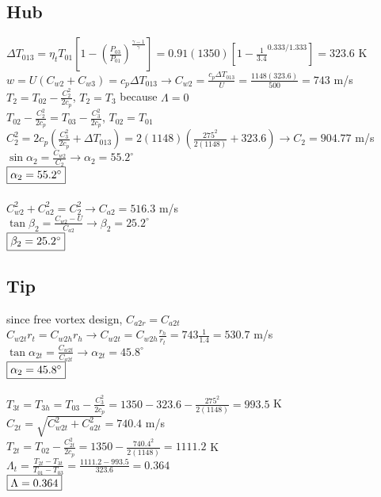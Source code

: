 \documentclass{article}
\begin{document}
\subsection*{Hub}
$\Delta T_{013}=\eta_t T_{01}[1-(\frac{P_{03}}{P_{01}})^\frac{\gamma-1}{\gamma}]=
0.91(1350)[1-\frac{1}{3.4}^{0.333/1.333}]=323.6$ K \\
$w=U(C_{w2}+C_{w3})=c_p\Delta T_{013} \rightarrow C_{w2}=\frac{c_p \Delta T_{013}}{U}=
\frac{1148(323.6)}{500}=743$ m/s \\
$T_2 = T_{02}-\frac{C_2^2}{2c_p}$, \quad $T_2=T_3$ because $\Lambda=0$ \\
$T_{02}-\frac{C_2^2}{2c_p}=T_{03}-\frac{C_3^2}{2c_p}$, \quad $T_{02}=T_{01}$ \\
$C_2^2=2c_p(\frac{C_3^2}{2c_p}+\Delta T_{013})=2(1148)(\frac{275^2}{2(1148)}+323.6) \rightarrow
C_2=904.77$ m/s \\
$\sin\alpha_2=\frac{C_{w2}}{C_2} \rightarrow \alpha_2=55.2^\circ$ \\
$\fbox{$\alpha_2=55.2^\circ$}$ \\\\
$C_{w2}^2+C_{a2}^2=C_2^2 \rightarrow C_{a2}=516.3$ m/s \\
$\tan\beta_2=\frac{C_{w2}-U}{C_{a2}} \rightarrow \beta_2=25.2^\circ$ \\
$\fbox{$\beta_2=25.2^\circ$}$

\subsection*{Tip}
since free vortex design, $C_{a2r}=C_{a2t}$ \\
$C_{w2t}r_t=C_{w2h}r_h \rightarrow C_{w2t}=C_{w2h}\frac{r_h}{r_t}=743\frac{1}{1.4}=530.7$ m/s \\
$\tan\alpha_{2t}=\frac{C_{w2t}}{C_{a2t}} \rightarrow \alpha_{2t}=45.8^\circ$ \\
$\fbox{$\alpha_2=45.8^\circ$}$ \\\\
$T_{3t}=T_{3h}=T_{03}-\frac{C_3^2}{2c_p}=1350-323.6-\frac{275^2}{2(1148)}=993.5$ K \\
$C_{2t}=\sqrt{C_{w2t}^2+C_{a2t}^2}=740.4$ m/s \\
$T_{2t}=T_{02}-\frac{C_{2t}^2}{2c_p}=1350-\frac{740.4^2}{2(1148)}=1111.2$ K \\
$\Lambda_t=\frac{T_{2t}-T_{3t}}{T_{01}-T_{03}}=\frac{1111.2-993.5}{323.6}=0.364$ \\
$\fbox{$\Lambda=0.364$}$
\end{document}
